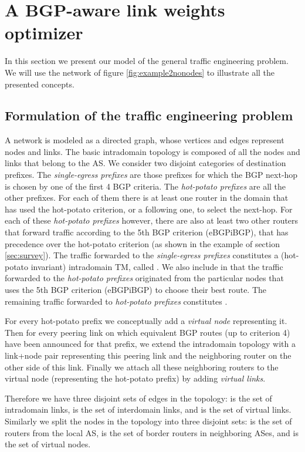 \documentclass{acm_proc_article-sp}
\begin{document}
\section{A BGP-aware link weights optimizer}
\label{sec:method}

In this section we present our model of the general traffic
engineering problem. We will use the network of figure
\ref{fig:example2nonodes} to illustrate all the presented
concepts. 

\subsection{Formulation of the traffic engineering problem}

A network is modeled as a directed graph,  whose vertices and edges
represent nodes and links. The basic intradomain topology is composed of all the
nodes and links that belong to the AS. 
We consider two disjoint categories of destination prefixes. 
The \textit{single-egress prefixes} are those prefixes for which the BGP next-hop 
is chosen by one of the first 4 BGP criteria. 
The \textit{hot-potato prefixes} are all the other prefixes. 
For each of them there is at least one router in the domain that has used the hot-potato criterion, 
or a following one, to select the next-hop. 
For each of these \textit{hot-potato prefixes} however, there are also
at least two other routers that forward traffic 
according to the 5th BGP criterion (eBGPiBGP), that has precedence over the
hot-potato criterion (as shown in the example of section
\ref{sec:survey}). The traffic forwarded to the
\textit{single-egress prefixes} constitutes a (hot-potato invariant)
intradomain TM, called  . We also include in that  the
traffic forwarded to the \textit{hot-potato prefixes} originated from
the particular nodes that uses the 5th BGP criterion (eBGPiBGP) to
choose their best route. The remaining traffic forwarded to
\textit{hot-potato prefixes} constitutes .

For every hot-potato prefix we conceptually add a \textit{virtual node} representing it.
Then for every peering link on which equivalent BGP routes (up to criterion 4)
have been announced for that prefix, we extend the intradomain topology 
with a link+node pair representing 
this peering link and the neighboring router on the other side of this link.
Finally we attach all these neighboring routers to the virtual node (representing the hot-potato prefix) 
by adding \textit{virtual links}.
 
Therefore we have three disjoint sets of edges in the topology:  is
the set of intradomain links,  is the set of
interdomain links, and  is the set of
virtual links. Similarly we split the nodes in the topology into three disjoint sets:
 is the set of routers
from the local AS,  is the set of border routers
in neighboring ASes, and
 is the set of virtual nodes.
\end{document}
